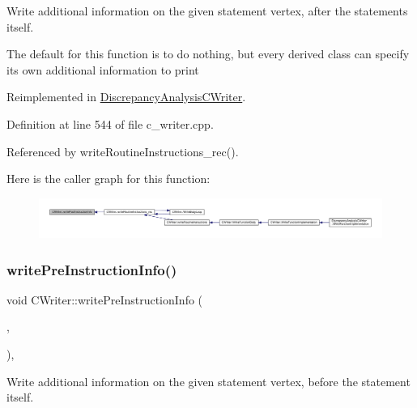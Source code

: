 Write additional information on the given statement vertex, after the statements itself. 

The default for this function is to do nothing, but every derived class can specify its own additional information to print 

Reimplemented in \hyperlink{classDiscrepancyAnalysisCWriter_aab973340021c0338599762a89589a588}{Discrepancy\+Analysis\+C\+Writer}.



Definition at line 544 of file c\+\_\+writer.\+cpp.



Referenced by write\+Routine\+Instructions\+\_\+rec().

Here is the caller graph for this function\+:
\nopagebreak
\begin{figure}[H]
\begin{center}
\leavevmode
\includegraphics[width=350pt]{d3/d59/classCWriter_ad32d1e42246eafd2825029065ccd6280_icgraph}
\end{center}
\end{figure}
\mbox{\label{classCWriter_a89fcc230d50a8b5087a08348b67b470a}} 
\subsubsection{\texorpdfstring{write\+Pre\+Instruction\+Info()}{writePreInstructionInfo()}}
{\footnotesize\ttfamily void C\+Writer\+::write\+Pre\+Instruction\+Info (\begin{DoxyParamCaption}\item[{const \hyperlink{function__behavior_8hpp_a94872da12ed056b6ecf90456164e0213}{Function\+Behavior\+Const\+Ref}}]{,  }\item[{const \hyperlink{graph_8hpp_abefdcf0544e601805af44eca032cca14}{vertex}}]{ }\end{DoxyParamCaption})\hspace{0.3cm}{\ttfamily [protected]}, {\ttfamily [virtual]}}



Write additional information on the given statement vertex, before the statement itself. 

